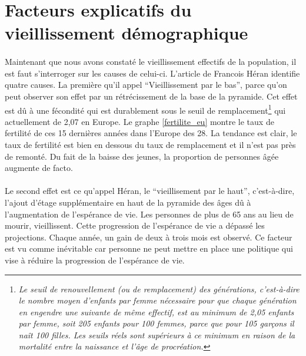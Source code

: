 \section{Facteurs explicatifs du vieillissement démographique}
\paragraph{}Maintenant que nous avons constaté le vieillissement effectifs de la population, il est faut s'interroger sur les causes de celui-ci. L’article de Francois Héran\citep[pp.1]{heran} identifie quatre causes. La première qu’il appel “Vieillissement par le bas”, parce qu’on peut observer son effet par un rétrécissement de la base de la pyramide. Cet effet est dû à une fécondité qui est durablement sous le seuil de remplacement\footnote{\textit{Le seuil de renouvellement (ou de remplacement) des générations, c'est-à-dire le nombre moyen d'enfants par femme nécessaire pour que chaque génération en engendre une suivante de même effectif, est au minimum de 2,05 enfants par femme, soit 205 enfants pour 100 femmes, parce que pour 105 garçons il naît 100 filles. Les seuils réels sont supérieurs à ce minimum en raison de la mortalité entre la naissance et l'âge de procréation.}\citep{renouvellement}
} qui actuellement de 2,07 en Europe. Le graphe \ref{fertilite_eu} montre le taux de fertilité de ces 15 dernières années dans l’Europe des 28. La tendance est clair, le taux de fertilité est bien en dessous du taux de remplacement et il n’est pas près de remonté. Du fait de la baisse des jeunes, la proportion de personnes âgée augmente de facto.  

\paragraph{}Le second effet est ce qu’appel Héran\citep[pp.1]{heran}, le “vieillisement par le haut”, c’est-à-dire, l’ajout d’étage supplémentaire en haut de la pyramide des âges dû à l’augmentation de l’espérance de vie.  Les personnes de plus de 65 ans au lieu de mourir, vieillissent. Cette progression de l’espérance de vie a dépassé les projections. Chaque année, un gain de deux à trois mois est observé. Ce facteur est vu comme inévitable car personne ne peut mettre en place une politique qui vise à réduire la progression de l’espérance de vie.

